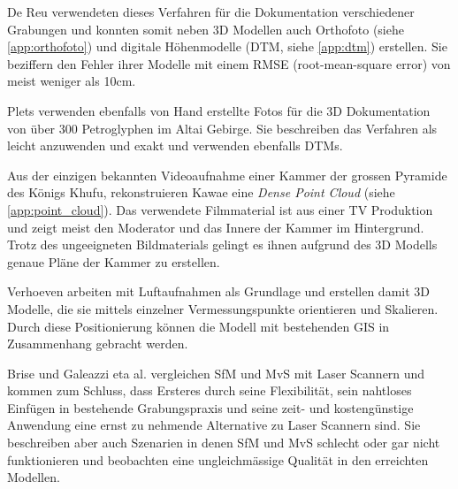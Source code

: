 			De Reu \etal {} verwendeten dieses Verfahren für die Dokumentation verschiedener Grabungen und konnten somit neben 3D Modellen auch Orthofoto (siehe \autoref{app:orthofoto}) und digitale Höhenmodelle (DTM, siehe \autoref{app:dtm}) erstellen. Sie beziffern den Fehler ihrer Modelle mit einem RMSE (root-mean-square error) von meist weniger als 10cm.
			
			Plets \etal {} verwenden ebenfalls von Hand erstellte Fotos für die 3D Dokumentation von über 300 Petroglyphen im Altai Gebirge. Sie beschreiben das Verfahren als leicht anzuwenden und exakt und verwenden ebenfalls DTMs.
			
			Aus der einzigen bekannten Videoaufnahme einer Kammer der grossen Pyramide des Königs Khufu, rekonstruieren Kawae \etal {} eine \emph{Dense Point Cloud} (siehe \autoref{app:point_cloud}). Das verwendete Filmmaterial ist aus einer TV Produktion und zeigt meist den Moderator und das Innere der Kammer im Hintergrund. Trotz des ungeeigneten Bildmaterials gelingt es ihnen aufgrund des 3D Modells genaue Pläne der Kammer zu erstellen.
			
			Verhoeven \etal {} arbeiten mit Luftaufnahmen als Grundlage und erstellen damit 3D Modelle, die sie mittels einzelner Vermessungspunkte orientieren und Skalieren. Durch diese Positionierung können die Modell mit bestehenden GIS in Zusammenhang gebracht werden.
			
			Brise \etal {} und Galeazzi eta al.  vergleichen SfM und MvS mit Laser Scannern und kommen zum Schluss, dass Ersteres durch seine Flexibilität, sein nahtloses Einfügen in bestehende Grabungspraxis und seine zeit- und kostengünstige Anwendung eine ernst zu nehmende Alternative zu Laser Scannern sind. Sie beschreiben aber auch Szenarien in denen SfM und MvS schlecht oder gar nicht funktionieren und beobachten eine ungleichmässige Qualität in den erreichten Modellen.